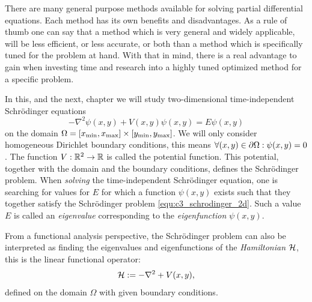 


\label{cha:c3}

There are many general purpose methods available for solving partial differential equations. Each method has its own benefits and disadvantages. As a rule of thumb one can say that a method which is very general and widely applicable, will be less efficient, or less accurate, or both than a method which is specifically tuned for the problem at hand. With that in mind, there is a real advantage to gain when investing time and research into a highly tuned optimized method for a specific problem.

In this, and the next, chapter we will study two-dimensional time-independent Schrödinger equations
\begin{equation}\label{equ:c3_schrodinger_2d}
  -\nabla^2\psi(x, y) + V(x, y) \psi(x, y) = E \psi(x, y)
\end{equation}
on the domain $\Omega = [{x_{\text{min}}}, {x_{\text{max}}}]\times[{y_{\text{min}}}, {y_{\text{max}}}]$. We will only consider homogeneous Dirichlet boundary conditions, this means $\forall (x, y) \in \partial\Omega : \psi(x, y) = 0$. The function $V: \mathbb{R}^2 \to \mathbb{R}$ is called the potential function. This potential, together with the domain and the boundary conditions, defines the Schrödinger problem. When \emph{solving} the time-independent Schrödinger equation, one is searching for values for $E$ for which a function $\psi(x, y)$  exists such that they together satisfy the Schrödinger problem \eqref{equ:c3_schrodinger_2d}. Such a value $E$ is called an \emph{eigenvalue} corresponding to the \emph{eigenfunction} $\psi(x, y)$.

From a functional analysis perspective, the Schrödinger problem can also be interpreted as finding the eigenvalues and eigenfunctions of the \emph{Hamiltonian} $\mathcal{H}$, this is the linear functional operator:
$$
  \mathcal{H} := -\nabla^2 + V(x, y)\text{,}
$$
defined on the domain $\Omega$ with given boundary conditions.

